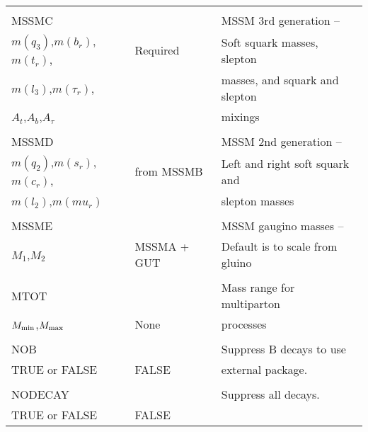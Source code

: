 \begin{center}
\begin{tabular}{lll}
                       &                   &                                \\
MSSMC                  &                   & MSSM 3rd generation --         \\
$m(q_3)$,$m(b_r)$,$m(t_r)$,  & Required    & Soft squark masses, slepton    \\
$m(l_3)$,$m(\tau_r)$,  &                   & masses, and squark and slepton \\
$A_t$,$A_b$,$A_\tau$   &                   & mixings                        \\
                       &                   &                                \\
MSSMD                  &                   & MSSM 2nd generation --         \\
$m(q_2)$,$m(s_r)$,$m(c_r)$,  & from MSSMB  & Left and right soft squark and \\
$m(l_2)$,$m(mu_r)$     &                   & slepton masses                 \\
                       &                   &                                \\
MSSME                  &                   & MSSM gaugino masses --         \\
$M_1$,$M_2$            & MSSMA + GUT       & Default is to scale from gluino\\
                       &                   &                                \\
MTOT                   &                   & Mass range for multiparton     \\
$M_{\rm min}$,$M_{\rm max}$ & None         & processes                      \\
                       &                   &                                \\
NOB                    &                   & Suppress B decays to use       \\
TRUE or FALSE          & FALSE             & external package.              \\
                       &                   &                                \\
NODECAY                &                   & Suppress all decays.           \\
TRUE or FALSE          & FALSE             &                                \\
\hline\hline
\end{tabular}
\end{center}

